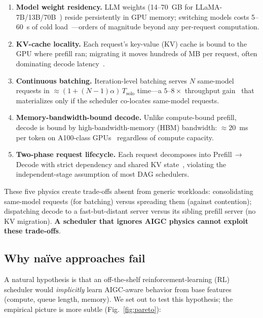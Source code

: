 \begin{enumerate}
\item \textbf{Model weight residency.} LLM weights (14--70~GB
  for LLaMA-7B/13B/70B~\cite{touvron2023llama}) reside
  persistently in GPU memory; switching models costs 5--60~s
  of cold load~\cite{fu2024serverlessllm}---orders of
  magnitude beyond any per-request computation.

\item \textbf{KV-cache locality.} Each request's key-value (KV)
  cache is bound to the GPU where prefill ran; migrating it
  moves hundreds of MB per request, often dominating decode
  latency~\cite{patel2024splitwise,kwon2023vllm}.

\item \textbf{Continuous batching.} Iteration-level batching
  serves $N$ same-model requests in
  ${\approx}(1 + (N-1)\alpha)\,T_{\text{solo}}$ time---a
  $5$--$8\times$ throughput
  gain~\cite{yu2022orca,kwon2023vllm} that materializes only
  if the scheduler co-locates same-model requests.

\item \textbf{Memory-bandwidth-bound decode.} Unlike
  compute-bound prefill, decode is bound by
  high-bandwidth-memory (HBM) bandwidth: ${\approx}20$~ms per
  token on A100-class
  GPUs~\cite{patel2024splitwise,agrawal2024sarathi} regardless
  of compute capacity.

\item \textbf{Two-phase request lifecycle.} Each request
  decomposes into Prefill$\,\to\,$Decode with strict dependency
  and shared KV state~\cite{zhong2024distserve}, violating the
  independent-stage assumption of most DAG schedulers.
\end{enumerate}

These five physics create trade-offs absent from generic
workloads: consolidating same-model requests (for batching)
versus spreading them (against contention); dispatching decode
to a fast-but-distant server versus its sibling prefill server
(no KV migration). \textbf{A scheduler that ignores AIGC
physics cannot exploit these trade-offs}.

\subsection{Why na\"ive approaches fail}

A natural hypothesis is that an off-the-shelf
reinforcement-learning (RL) scheduler would \emph{implicitly}
learn AIGC-aware behavior from base features (compute, queue
length, memory). We set out to test this hypothesis; the
empirical picture is more subtle (Fig.~\ref{fig:pareto}):

